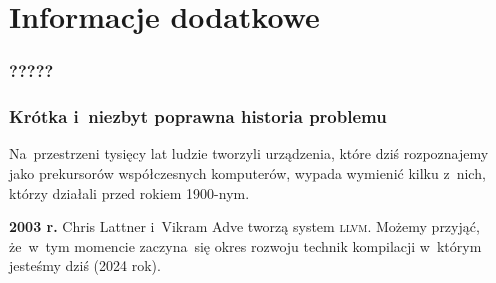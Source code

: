 \documentclass[10pt,t]{beamer}
\begin{document}
\appendix





\section{Informacje dodatkowe}









\begin{frame}
  \frametitle{?????}




\end{frame}





\begin{frame}
  \frametitle{Krótka i~niezbyt poprawna historia problemu}


  Na~przestrzeni tysięcy lat ludzie tworzyli urządzenia, które dziś
  rozpoznajemy jako prekursorów współczesnych komputerów, wypada wymienić
  kilku z~nich, którzy działali przed rokiem 1900-nym.

  \textbf{2003 r.} Chris Lattner i~Vikram Adve tworzą system \textsc{llvm}.
  Możemy przyjąć, że~w~tym momencie zaczyna~się okres rozwoju technik
  kompilacji w~którym jesteśmy dziś (2024 rok).

\end{frame}






















\end{document}
